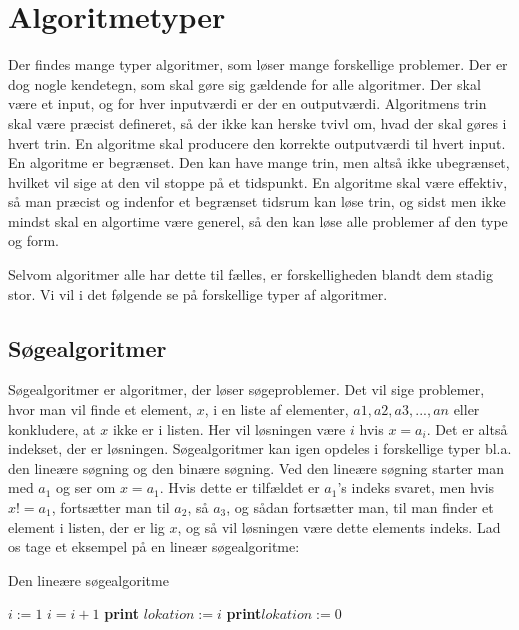 \section{Algoritmetyper}
Der findes mange typer algoritmer, som løser mange forskellige problemer. Der er dog nogle kendetegn, som skal gøre sig gældende for alle algoritmer. Der skal være et input, og for hver inputværdi er der en outputværdi. Algoritmens trin skal være præcist defineret, så der ikke kan herske tvivl om, hvad der skal gøres i hvert trin. En algoritme skal producere den korrekte outputværdi til hvert input. En algoritme er begrænset. Den kan have mange trin, men altså ikke ubegrænset, hvilket vil sige at den vil stoppe på et tidspunkt. En algoritme skal være effektiv, så man præcist og indenfor et begrænset tidsrum kan løse trin, og sidst men ikke mindst skal en algortime være generel, så den kan løse alle problemer af den type og form.

Selvom algoritmer alle har dette til fælles, er forskelligheden blandt dem stadig stor. Vi vil i det følgende se på forskellige typer af algoritmer.
\subsection{Søgealgoritmer}
Søgealgoritmer er algoritmer, der løser søgeproblemer. Det vil sige problemer, hvor man vil finde et element, $x$, i en liste af elementer, $a1, a2, a3, ..., an$ eller konkludere, at $x$ ikke er i listen. Her vil løsningen være $i$ hvis $x=a_{i}$. Det er altså indekset, der er løsningen. Søgealgoritmer kan igen opdeles i forskellige typer bl.a. den lineære søgning og den binære søgning. Ved den lineære søgning starter man med $a_1$ og ser om $x=a_{1}$. Hvis dette er tilfældet er $a_{1}$'s indeks svaret, men hvis $x!=a_{1}$, fortsætter man til $a_{2}$, så $a_{3}$, og sådan fortsætter man, til man finder et element i listen, der er lig $x$, og så vil løsningen være dette elements indeks. Lad os tage et eksempel på en lineær søgealgoritme:

\begin{algorithm}[H]
\caption{Den lineære søgealgoritme}
\begin{algorithmic}[1]

    \State $i:=1$
        \State $i=i+1$
    \State \textbf{print} $lokation:=i$
    \Else
    \State \textbf{print}$lokation:=0$
    \EndIf
    \EndWhile  \label{roy's loop}
\EndProcedure

\end{algorithmic}
\end{algorithm}


